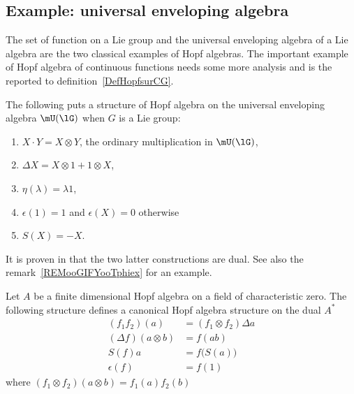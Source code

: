 \subsection{Example: universal enveloping algebra}
\label{SUBSECooTKZAooWVXXug}
The set of function on a Lie group and the universal enveloping algebra of a Lie algebra are the two classical examples of Hopf algebras.  The important example of Hopf algebra of continuous functions needs some more analysis and is the reported to definition~\ref{DefHopfsurCG}.

The following puts a structure of Hopf algebra on the universal enveloping algebra $\mU(\lG)$ when $G$ is a Lie group:
\begin{enumerate}

	\item
	      $X\cdot Y=X\otimes Y$, the ordinary multiplication in $\mU(\lG)$,
	\item
	      $\Delta X=X\otimes 1+1\otimes X$,
	\item
	      $\eta(\lambda)=\lambda 1$,
	\item	\label{ItemCounitUg}
	      $\epsilon(1)=1$ and $\epsilon(X)=0$ otherwise
	\item
	      $S(X)=-X$.
\end{enumerate}

It is proven in \cite{Tjin} that the two latter constructions are dual.  See also the remark~\ref{REMooGIFYooTphiex} for an example.


\begin{proposition}     \label{PropHopfSurDual}
	Let \( A\) be a finite dimensional Hopf algebra on a field of characteristic zero. The following structure defines a canonical Hopf algebra structure on the dual \( A^*\)
	\begin{subequations}
		\begin{align}
			(f_1f_2)(a)            & =(f_1\otimes f_2)\Delta a            \\
			(\Delta f)(a\otimes b) & =f(ab)       \label{DefHopfSurAstar} \\
			S(f)a                  & =f\big( S(a) \big)                   \\
			\epsilon(f)            & =f(1)
		\end{align}
	\end{subequations}
	where \( (f_1\otimes f_2)(a\otimes b)=f_1(a)f_2(b)\)
\end{proposition}

